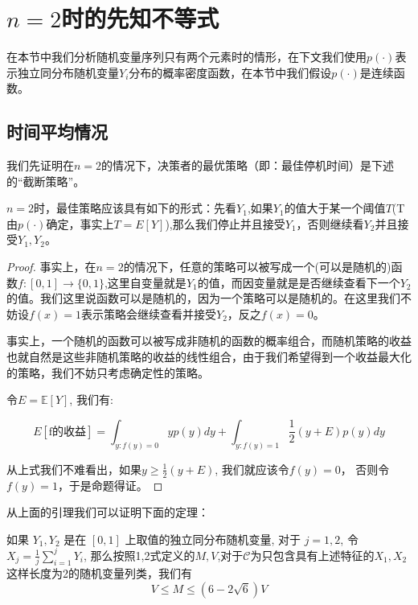 \documentclass[bachelor]{thuthesis}
\begin{document}

\chapter{$n=2$时的先知不等式}
\label{cha:china}

在本节中我们分析随机变量序列只有两个元素时的情形，在下文我们使用$p(\cdot)$表示独立同分布随机变量$Y_i$分布的概率密度函数，在本节中我们假设$p(\cdot)$是连续函数。

\section{时间平均情况}

我们先证明在$n=2$的情况下，决策者的最优策略（即：最佳停机时间）是下述的``截断策略''。

\begin{lemma}

$n=2$时，最佳策略应该具有如下的形式：先看$Y_1$,如果$Y_1$的值大于某一个阈值$T$(T由$p(\cdot)$确定，事实上$T=E[Y]$),那么我们停止并且接受$Y_1$，否则继续看$Y_2$并且接受$Y_1, Y_2$。

\end{lemma}

\begin{proof}

事实上，在$n=2$的情况下，任意的策略可以被写成一个(可以是随机的)函数$f:[0,1]\to \{0,1\}$,这里自变量就是$Y_1$的值，而因变量就是是否继续查看下一个$Y_2$的值。我们这里说函数可以是随机的，因为一个策略可以是随机的。在这里我们不妨设$f(x)=1$表示策略会继续查看并接受$Y_2$，反之$f(x)=0$。

事实上，一个随机的函数可以被写成非随机的函数的概率组合，而随机策略的收益也就自然是这些非随机策略的收益的线性组合，由于我们希望得到一个收益最大化的策略，我们不妨只考虑确定性的策略。

令$E=\mathbb{E}[Y]$, 我们有:

\[E[\text{f的收益}]=\int_{y:f(y)=0} yp(y)dy + \int_{y:f(y)=1} \frac{1}{2}(y+E)p(y)dy\]

从上式我们不难看出，如果$y\ge \frac{1}{2}(y+E)$, 我们就应该令$f(y)=0$， 否则令$f(y)=1$，于是命题得证。

\end{proof}

从上面的引理我们可以证明下面的定理：

\begin{theorem}

如果 $Y_1,Y_2$ 是在 $[0,1]$ 上取值的独立同分布随机变量, 对于 $j=1,2$, 令 $X_j=\frac{1}{j}\sum_{i=1}^{j}Y_i$, 那么按照1,2式定义的$M,V$,对于$\mathcal{C}$为只包含具有上述特征的$X_1,X_2$这样长度为2的随机变量列类，我们有
\[V\le M\le (6-2\sqrt{6})V\]

\end{theorem}
\end{document}
